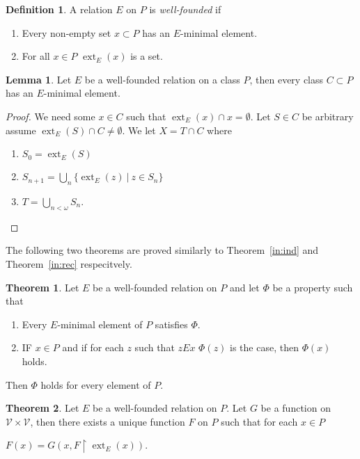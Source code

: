 \documentclass[8pt]{article}
\theoremstyle{definition}
\newtheorem{definition}{Definition}[section]
\theoremstyle{definition}
\newtheorem{theorem}{Theorem}[section]
\theoremstyle{definition}
\theoremstyle{definition}
\theoremstyle{definition}
\theoremstyle{definition}
\theoremstyle{definition}
\theoremstyle{definition}
\newtheorem{lemma}{Lemma}[section]
\theoremstyle{definition}
\theoremstyle{definition}
\theoremstyle{definition}
\theoremstyle{definition}
\theoremstyle{definition}
\theoremstyle{definition}
\theoremstyle{question}
\begin{document}
\begin{definition}
  A relation $E$ on $P$ is \emph{well-founded} if
  \begin{enumerate}
    \item Every non-empty set $x \subset P$ has an $E$-minimal element. 
    \item For all $x \in P$ $\operatorname{ext}_E(x)$ is a set.
  \end{enumerate}
\end{definition}

\begin{lemma}
  Let $E$ be a well-founded relation on a class $P$, then every class $C \subset P$ has an $E$-minimal element.
\end{lemma}

\begin{proof}
  We need some $x \in C$ such that $\operatorname{ext}_E(x) \cap x = \emptyset$.
  Let $S \in C$ be arbitrary assume $\operatorname{ext}_E(S) \cap C \neq \emptyset$.
  We let $X = T \cap C$ where
  \begin{enumerate}
    \item $S_0 = \operatorname{ext}_E(S)$ 

    \item $S_{n + 1} = \bigcup \limits_{n} \{ \operatorname{ext}_E(z) \: |\: z \in S_n \}$

    \item $T = \bigcup \limits_{n < \omega} S_n$.
  \end{enumerate}
\end{proof}

The following two theorems are proved similarly to Theorem~\ref{in:ind} and Theorem~\ref{in:rec} respecitvely.

\begin{theorem}
  Let $E$ be a well-founded relation on $P$ and let $\Phi$ be a property such that
  \begin{enumerate}
    \item Every $E$-minimal element of $P$ satisfies $\Phi$.
    \item IF $x \in P$ and if for each $z$ such that $z E x$ $\Phi(z)$ is the case, then $\Phi(x)$ holds.
  \end{enumerate}

  Then $\Phi$ holds for every element of $P$.
\end{theorem}

\begin{theorem}
  Let $E$ be a well-founded relation on $P$. Let $G$ be a function on $\mathcal{V} \times \mathcal{V}$, 
  then there exists a unique function $F$ on $P$ such that for each $x \in P$
  \begin{center}
    $F(x) = G(x, F \upharpoonright \operatorname{ext}_E(x))$.
  \end{center}
\end{theorem}
\end{document}
